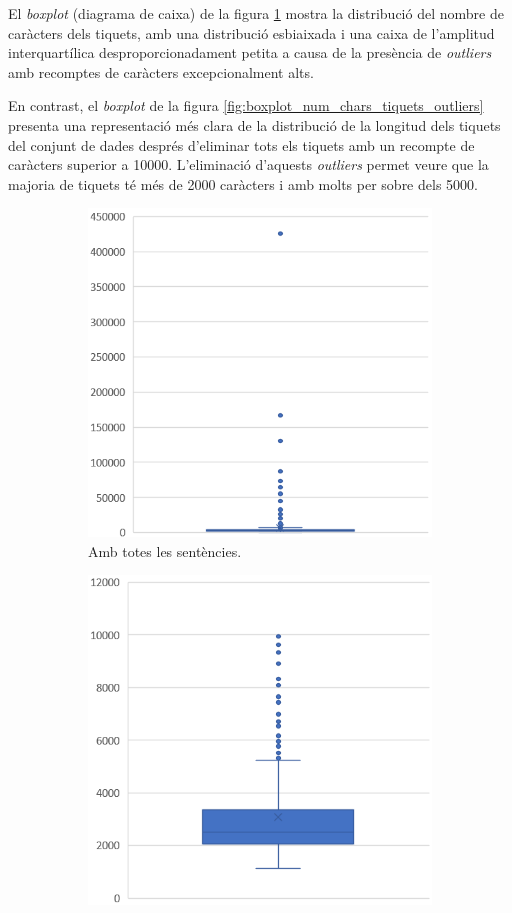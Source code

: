 El \textit{boxplot} (diagrama de caixa) de la figura \ref{fig:boxplot_num_chars_tiquets} mostra la distribució del nombre de caràcters dels tiquets, amb una distribució esbiaixada i una caixa de l'amplitud interquartílica desproporcionadament petita a causa de la presència de \textit{outliers} amb recomptes de caràcters excepcionalment alts.

En contrast, el \textit{boxplot} de la figura \ref{fig:boxplot_num_chars_tiquets_outliers} presenta una representació més clara de la distribució de la longitud dels tiquets del conjunt de dades després d'eliminar tots els tiquets amb un recompte de caràcters superior a 10000. L'eliminació d'aquests \textit{outliers} permet veure que la majoria de tiquets té més de 2000 caràcters i amb molts per sobre dels 5000.

\begin{figure}[H]
    \centering
    \begin{subfigure}{.5\textwidth}
      \centering
      \includegraphics[width=.7\linewidth]{boxplot_num_chars_tiquets.png}
      \caption{Amb totes les sentències.}
      \label{fig:boxplot_num_chars_tiquets}
    \end{subfigure}%
    \begin{subfigure}{.5\textwidth}
      \centering
      \includegraphics[width=.7\linewidth]{boxplot_num_chars_tiquets_outliers.png}

\end{subfigure}
\end{figure}
